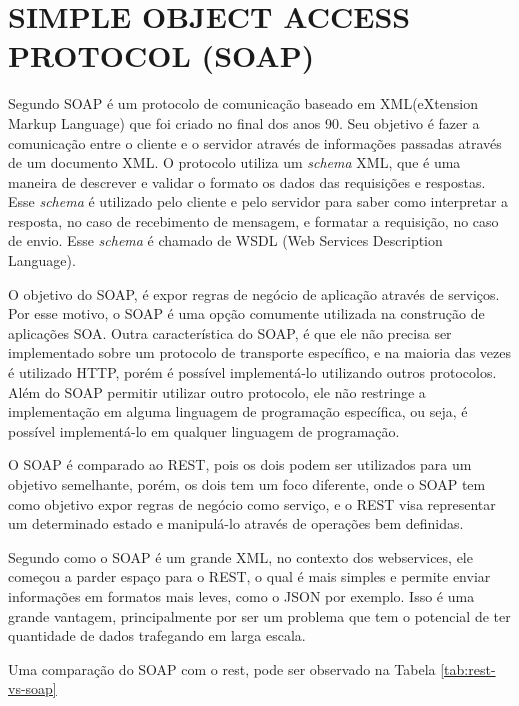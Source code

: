

\section{SIMPLE OBJECT ACCESS PROTOCOL (SOAP)}
Segundo \cite{lecheta} SOAP é um protocolo de comunicação baseado em XML(eXtension Markup Language) que foi criado no final 
dos anos 90. Seu objetivo é fazer a comunicação entre o cliente e o servidor através de informações 
passadas através de um documento XML. O protocolo utiliza um \textit{schema} XML, que é uma 
maneira de descrever e validar o formato os dados das requisições e respostas. 
Esse \textit{schema} é utilizado pelo cliente e pelo servidor para saber como interpretar 
a resposta, no caso de recebimento de mensagem, e formatar a requisição, no caso de envio.
Esse \textit{schema} é chamado de WSDL (Web Services Description Language).

O objetivo do SOAP, é expor regras de negócio de aplicação através de serviços. 
Por esse motivo, o SOAP é uma opção comumente utilizada na construção de aplicações SOA. 
Outra característica do SOAP, é que ele não precisa ser implementado sobre um protocolo de 
transporte específico, e na maioria das vezes é utilizado HTTP, porém é possível implementá-lo
utilizando outros protocolos. Além do SOAP permitir utilizar outro protocolo, 
ele não restringe a implementação em alguma linguagem de programação específica, ou seja,
é possível implementá-lo em qualquer linguagem de programação.

O SOAP é comparado ao REST, pois os dois podem ser utilizados para um objetivo 
semelhante, porém, os dois tem um foco diferente, onde o SOAP tem como objetivo expor regras de negócio 
como serviço, e o REST visa representar um determinado estado e manipulá-lo através de operações 
bem definidas.

Segundo \cite{lecheta} como o SOAP é um grande XML, no contexto dos webservices, ele começou
a parder espaço para o REST, o qual é mais simples 
e permite enviar informações em formatos mais leves, como o JSON por exemplo. 
Isso é uma grande vantagem, principalmente por ser um problema
que tem o potencial de ter quantidade de dados trafegando em larga escala.

Uma comparação do SOAP com o rest, pode ser observado na Tabela \ref{tab:rest-vs-soap}



